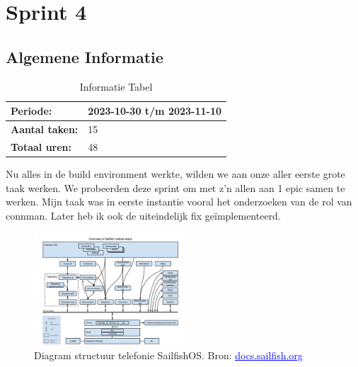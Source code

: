 \documentclass[a4paper]{report}
\newcommand{\styledhref}[2]{%
    \href{#1}{\textcolor{blue}{\underline{#2}}} %
}
\begin{document}
\chapter{Sprint 4}
\section{Algemene Informatie}
\begin{table}[H]
  \begin{tabularx}{0.6\textwidth}{|X|X|}
    \hline
    \cellcolor[HTML]{99ccff} \textbf{Periode:} & 2023-10-30 t/m 2023-11-10 \\ 
    \hline
    \cellcolor[HTML]{99ccff} \textbf{Aantal taken:} & 15 \\ 
    \hline
    \cellcolor[HTML]{99ccff} \textbf{Totaal uren:} & 48 \\ 
    \hline
  \end{tabularx}
  \caption{Informatie Tabel}
  \label{table:it4:general}
  \end{table}

Nu alles in de build environment werkte, wilden we aan onze aller eerste grote taak werken.
We probeerden deze sprint om met z'n allen aan 1 epic samen te werken.
Mijn taak was in eerste instantie vooral het onderzoeken van de rol van connman.
Later heb ik ook de uiteindelijk fix geïmplementeerd.  

\begin{figure}[ht]
  \centering
  \includegraphics[width=0.5\textwidth]{Images/cellulardiagram}
  \caption{Diagram structuur telefonie SailfishOS. Bron: \styledhref{https://docs.sailfishos.org/Reference/Core_Areas_and_APIs/Networking/Cellular_Telephony_Architecture/}{docs.sailfish.org}}
  \label{fig:cellulardiagram}
  \end{figure}
  
\end{document}
